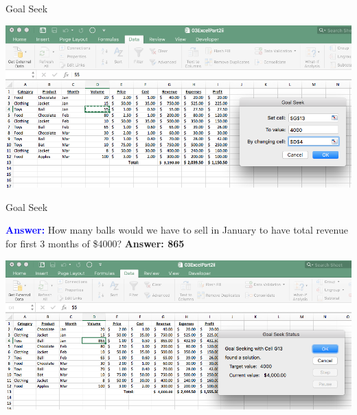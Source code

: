 \documentclass[xcolor=svgnames, handout]{beamer}
\newcommand{\blue}[1]{{\textcolor{blue}{#1}}}
\begin{document}
\begin{frame}{Goal Seek}
\begin{center}
\includegraphics[width=.99\textwidth]{GoalSeek1}
\end{center}
\end{frame}

\begin{frame}{Goal Seek}
\begin{block}
{}\blue{\bf Answer:} How many balls would we have to sell in January to have total revenue for first 3 months of \$4000?  
{\bf Answer: 865}	
\end{block}
\begin{center}
\includegraphics[width=.99\textwidth]{GoalSeek2}
\end{center}
\end{frame}
\end{document}
